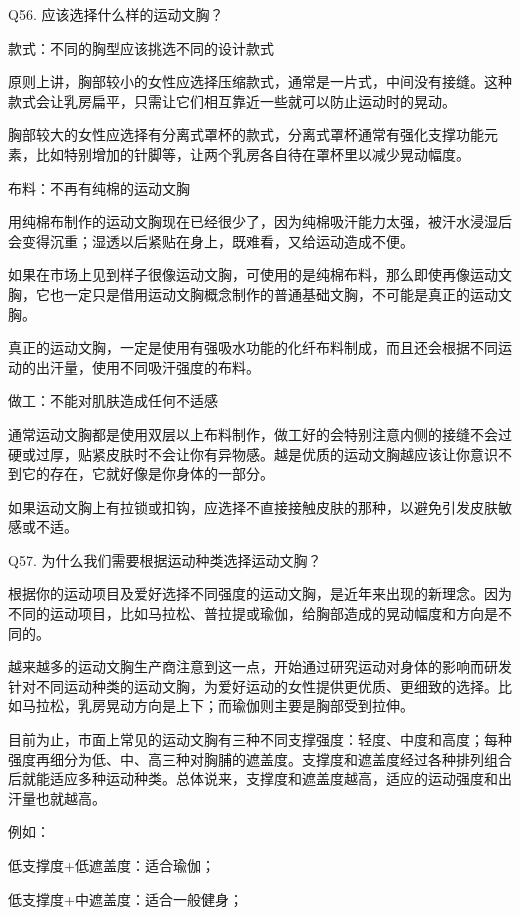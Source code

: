 \documentclass[12pt,UTF8]{ctexbook}
\begin{document}
Q56. 应该选择什么样的运动文胸？




款式：不同的胸型应该挑选不同的设计款式

原则上讲，胸部较小的女性应选择压缩款式，通常是一片式，中间没有接缝。这种款式会让乳房扁平，只需让它们相互靠近一些就可以防止运动时的晃动。

胸部较大的女性应选择有分离式罩杯的款式，分离式罩杯通常有强化支撑功能元素，比如特别增加的针脚等，让两个乳房各自待在罩杯里以减少晃动幅度。

布料：不再有纯棉的运动文胸

用纯棉布制作的运动文胸现在已经很少了，因为纯棉吸汗能力太强，被汗水浸湿后会变得沉重；湿透以后紧贴在身上，既难看，又给运动造成不便。

如果在市场上见到样子很像运动文胸，可使用的是纯棉布料，那么即使再像运动文胸，它也一定只是借用运动文胸概念制作的普通基础文胸，不可能是真正的运动文胸。

真正的运动文胸，一定是使用有强吸水功能的化纤布料制成，而且还会根据不同运动的出汗量，使用不同吸汗强度的布料。

做工：不能对肌肤造成任何不适感

通常运动文胸都是使用双层以上布料制作，做工好的会特别注意内侧的接缝不会过硬或过厚，贴紧皮肤时不会让你有异物感。越是优质的运动文胸越应该让你意识不到它的存在，它就好像是你身体的一部分。

如果运动文胸上有拉锁或扣钩，应选择不直接接触皮肤的那种，以避免引发皮肤敏感或不适。





Q57. 为什么我们需要根据运动种类选择运动文胸？


根据你的运动项目及爱好选择不同强度的运动文胸，是近年来出现的新理念。因为不同的运动项目，比如马拉松、普拉提或瑜伽，给胸部造成的晃动幅度和方向是不同的。

越来越多的运动文胸生产商注意到这一点，开始通过研究运动对身体的影响而研发针对不同运动种类的运动文胸，为爱好运动的女性提供更优质、更细致的选择。比如马拉松，乳房晃动方向是上下；而瑜伽则主要是胸部受到拉伸。

目前为止，市面上常见的运动文胸有三种不同支撑强度：轻度、中度和高度；每种强度再细分为低、中、高三种对胸脯的遮盖度。支撑度和遮盖度经过各种排列组合后就能适应多种运动种类。总体说来，支撑度和遮盖度越高，适应的运动强度和出汗量也就越高。


例如：

低支撑度+低遮盖度：适合瑜伽；

低支撑度+中遮盖度：适合一般健身；
\end{document}
